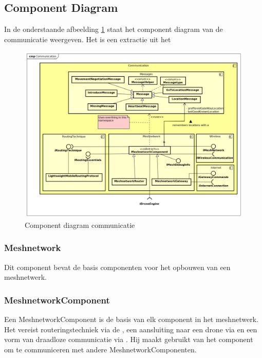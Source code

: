 \documentclass[a4paper, 11pt, oneside]{report}
\begin{document}
\label{DetailedDesign:Communicatie}
\subsection{Component Diagram}
\label{DetailedDesign:CommunicatieComponentDiagram}
In de onderstaande afbeelding \ref{fig:component:Communicatie} staat het component diagram van de communicatie weergeven.
Het is een extractie uit het  
\begin{figure}[H]
	\begin{center}\includegraphics[width=\linewidth]{Afbeeldingen/CommunicationComponentDiagram.png}\end{center}
	\caption{Component diagram communicatie}
	\label{fig:component:Communicatie}
\end{figure}


\subsubsection{Meshnetwork}
\label{architectural:subcomponenten:Meshnetwork}
Dit component bevat de basis componenten voor het opbouwen van een meshnetwerk.

\subsubsection{MeshnetworkComponent}

\label{architectural:subcomponenten:MeshnetworkComponent}
Een MeshnetworkComponent is de basis van elk component in het meshnetwerk.
Het vereist routeringstechniek via de , een aansluiting naar een drone via  en een vorm van draadloze communicatie via .
Hij maakt gebruikt van het component  om te communiceren met andere MeshnetworkComponenten.
\end{document}
